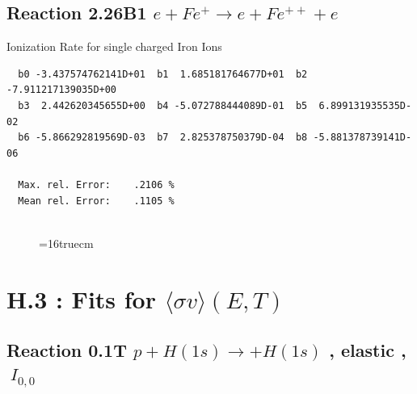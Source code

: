 \documentclass[12pt,dvips]{article}
\begin{document}
\subsection{
Reaction 2.26B1   $e + Fe^+ \rightarrow e + Fe^{++} + e$
}

  Ionization Rate for single charged Iron Ions

\begin{small}\begin{verbatim}
  b0 -3.437574762141D+01  b1  1.685181764677D+01  b2 -7.911217139035D+00
  b3  2.442620345655D+00  b4 -5.072788444089D-01  b5  6.899131935535D-02
  b6 -5.866292819569D-03  b7  2.825378750379D-04  b8 -5.881378739141D-06

  Max. rel. Error:    .2106 %
  Mean rel. Error:    .1105 %


\end{verbatim}\end{small}


\begin{figure} \label{2.26B}
\epsfxsize=16truecm
\end{figure}
\newpage

\section{H.3 : Fits for $\langle\sigma v \rangle (E,T)$}\label{sect3}


\subsection{
Reaction 0.1T  $p + H(1s) \rightarrow  + H(1s)$
, elastic ,
$\  I_{0,0}$
}
\end{document}
